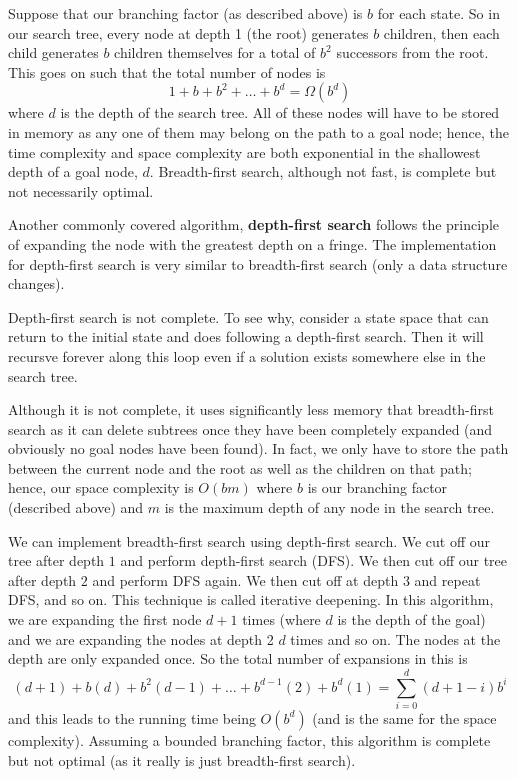 \begin{example}
    Suppose that our branching factor (as described above) is $b$ for each state. So in our search tree, every node at depth 1 (the root) generates $b$ children, then each child generates $b$ children themselves for a total of $b^2$ successors from the root. This goes on such that the total number of nodes is
    \[ 1 + b + b^2 + \ldots + b^d = \Omega(b^d) \]
    where $d$ is the depth of the search tree. All of these nodes will have to be stored in memory as any one of them may belong on the path to a goal node; hence, the time complexity and space complexity are both exponential in the shallowest depth of a goal node, $d$. Breadth-first search, although not fast, is complete but not necessarily optimal.
\end{example}

\begin{example}
    Another commonly covered algorithm, \textbf{depth-first search} follows the principle of expanding the node with the greatest depth on a fringe. The implementation for depth-first search is very similar to breadth-first search (only a data structure changes).
\end{example}

\begin{example}
    Depth-first search is not complete. To see why, consider a state space that can return to the initial state and does following a depth-first search. Then it will recursve forever along this loop even if a solution exists somewhere else in the search tree. 

    Although it is not complete, it uses significantly less memory that breadth-first search as it can delete subtrees once they have been completely expanded (and obviously no goal nodes have been found). In fact, we only have to store the path between the current node and the root as well as the children on that path; hence, our space complexity is $O(bm)$ where $b$ is our branching factor (described above) and $m$ is the maximum depth of any node in the search tree.
\end{example}

\begin{example}
    We can implement breadth-first search using depth-first search. We cut off our tree after depth $1$ and perform depth-first search (DFS). We then cut off our tree after depth $2$ and perform DFS again. We then cut off at depth $3$ and repeat DFS, and so on. This technique is called iterative deepening. In this algorithm, we are expanding the first node $d+1$ times (where $d$ is the depth of the goal) and we are expanding the nodes at depth 2 $d$ times and so on. The nodes at the depth are only expanded once. So the total number of expansions in this is
    \[ (d+1) + b(d) + b^2(d-1) + \ldots + b^{d-1}(2) + b^d(1) = \sum_{i = 0}^d (d + 1 - i) b^i \]
    and this leads to the running time being $O(b^d)$ (and is the same for the space complexity). Assuming a bounded branching factor, this algorithm is complete but not optimal (as it really is just breadth-first search).
\end{example}
